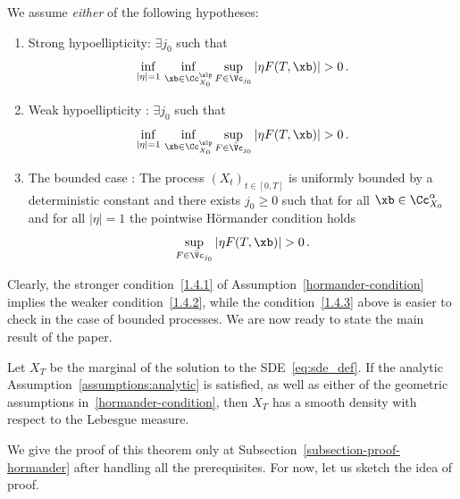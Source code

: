 \begin{assumption}\label{hormander-condition}
We assume \emph{either} of the following hypotheses:
\begin{enumerate}
\item \label{1.4.1} Strong hypoellipticity: $\exists j_0$ such that
\[
\inf_{|\eta|=1}\,\inf_{\xb\in \Cc^\alp_{X_0}} \sup_{F\in \Vc_{j_0}} |\eta F(T,\xb)|>0\, .
\]

\item \label{1.4.2}Weak hypoellipticity : $\exists j_0$ such that
\[
\inf_{|\eta|=1}\,\inf_{\xb\in \Cc^\alp_{X_0}} \sup_{F\in \bar \Vc_{j_0} } |\eta F(T,\xb)|>0 \, .
\]
\item \label{1.4.3}The bounded case : The process $(X_t)_{t\in [0,T]}$ is uniformly bounded by a deterministic constant and there exists $j_0\geq 0$ such that for all $\xb\in\Cc^\alpha_{X_0}$ and for all $|\eta|=1$ the pointwise H\"ormander condition holds
\begin{equation}\label{pointwise-hormander}
\sup_{F\in \bar \Vc_{j_0} } |\eta F(T,\xb)|>0 \, .
\end{equation}
\end{enumerate}
\end{assumption}


Clearly, the stronger condition~\eqref{1.4.1} of Assumption~\ref{hormander-condition} implies the weaker condition~\eqref{1.4.2}, while the condition~\eqref{1.4.3} above is easier to check in the case of bounded processes. We are now ready to state the main result of the paper.

\begin{theo}\label{thm:hormander}
Let $X_T$ be the marginal of the solution to the SDE~\eqref{eq:sde_def}. If the analytic Assumption~\ref{assumptions:analytic} is satisfied, as well as either of the geometric assumptions in~\ref{hormander-condition}, then $X_T$ has a smooth density with respect to the Lebesgue measure.
\end{theo}

We give the proof of this theorem only at Subsection~\ref{subsection-proof-hormander} after handling all the prerequisites. For now, let us sketch the idea of proof.


